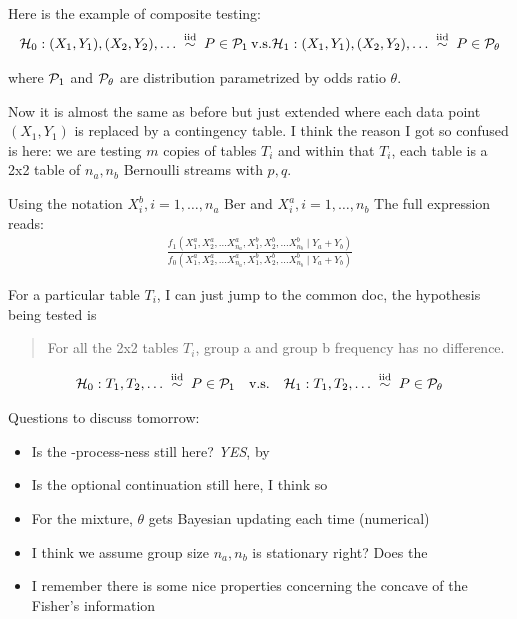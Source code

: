 Here is the example of composite testing:
\begin{align*}
	\hypN: (X_1, Y_1), (X_2,Y_2),\dots \iid P \in \Pc_1 \: \textrm{v.s.}
	\hypA: (X_1, Y_1), (X_2,Y_2),\dots \iid P \in \Pc_{\theta}
\end{align*}

where $\mathcal{P}_1$ and $\mathcal{P}_{\theta}$ are distribution parametrized by odds ratio $\theta$.

Now it is almost the same as before but just extended where each data point $(X_1, Y_1)$
is replaced by a contingency table.
I think the reason I got so confused is here:
we are testing $m$ copies of tables $T_i$ and within that $T_i$,
each table is a 2x2 table of $n_a, n_b$ Bernoulli streams with $p, q$.

Using the notation $X^b_i, i = 1,\dots, n_a$ Ber and $X^a_i, i =1,\dots,n_b$
The full expression reads:
\begin{align*}
	\frac{f_1(X_1^a, X_2^a,\dots X_{n_a}^a, X_1^b, X_2^b,\dots X_{n_b}^b \mid Y_a + Y_b)}
	{f_0(X_1^a, X_2^a,\dots X_{n_a}^a, X_1^b, X_2^b,\dots X_{n_b}^b \mid Y_a + Y_b)}
\end{align*}

For a particular table $T_i$, I can just jump to the common doc, the hypothesis being tested is

\begin{quote}
	For all the 2x2 tables $T_i$, group a and group b frequency
	has no difference.
\end{quote}

\begin{align*}
	\hypN: T_1, T_2, \dots \iid P \in \Pc_1
	\quad \textrm{v.s.} \quad
	\hypA: T_1, T_2, \dots \iid P \in \Pc_{\theta}
\end{align*}

Questions to discuss tomorrow:

\begin{itemize}
	\item Is the \E-process-ness still here? \emph{YES}, by
	\item Is the optional continuation still here, I think so
	\item For the mixture, $\theta$ gets Bayesian updating each time (numerical)
	\item I think we assume group size $n_a, n_b$ is stationary right? Does the
	\item I remember there is some nice properties concerning the concave of the Fisher's information
\end{itemize}

